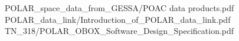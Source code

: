 \documentclass[a4paper, 12pt, onecolumn]{article}
\begin{document}
\begin{thebibliography}{9}
 POLAR\_space\_data\_from\_GESSA/POAC data products.pdf
 POLAR\_data\_link/Introduction\_of\_POLAR\_data\_link.pdf
 TN\_318/POLAR\_OBOX\_Software\_Design\_Specification.pdf
\end{thebibliography}
\end{document}
